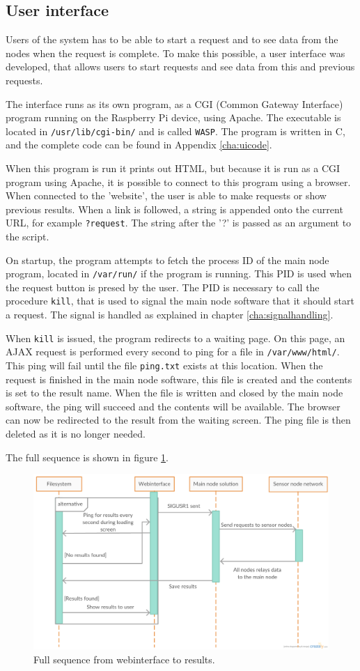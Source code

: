 \subsection{User interface} \label{cha:webinterface}
Users of the system has to be able to start a request and to see data from the nodes when the request is complete. To make this possible, a user interface was developed, that allows users to start requests and see data from this and previous requests.

The interface runs as its own program, as a CGI (Common Gateway Interface) program running on the Raspberry Pi device, using Apache. The executable is located in \texttt{/usr/lib/cgi-bin/} and is called \texttt{WASP}. The program is written in C, and the complete code can be found in Appendix \ref{cha:uicode}.

When this program is run it prints out HTML, but because it is run as a CGI program using Apache, it is possible to connect to this program using a browser. When connected to the 'website', the user is able to make requests or show previous results. When a link is followed, a string is appended onto the current URL, for example \texttt{?request}. The string after the '?' is passed as an argument to the script.

On startup, the program attempts to fetch the process ID of the main node program, located in \texttt{/var/run/} if the program is running. This PID is used when the request button is presed by the user. The PID is necessary to call the procedure \texttt{kill}, that is used to signal the main node software that it should start a request. The signal is handled as explained in chapter \ref{cha:signalhandling}.

When \texttt{kill} is issued, the program redirects to a waiting page. On this page, an AJAX request is performed every second to ping for a file in \texttt{/var/www/html/}. This ping will fail until the file \texttt{ping.txt} exists at this location. When the request is finished in the main node software, this file is created and the contents is set to the result name. When the file is written and closed by the main node software, the ping will succeed and the contents will be available. The browser can now be redirected to the result from the waiting screen. The ping file is then deleted as it is no longer needed.

The full sequence is shown in figure \ref{fig:sigsequence}.
\begin{figure}[h!]
\centering
\includegraphics[width=1.1\textwidth]{chapters/implementation/figures/sigsequence.png}
\caption{Full sequence from webinterface to results\cite{creately}.}
\label{fig:sigsequence}
\end{figure}